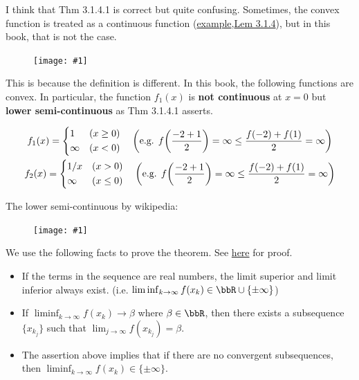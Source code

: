 \documentclass[a4paper, 14pt, dvipdfmx]{extarticle}
\newcommand{\IMG}[2]{
    \begin{figure}[H]
        \centering
        \texttt{[image: \#1]}
    \end{figure}
}
\begin{document}
I think that Thm 3.1.4.1 is correct but quite confusing.
Sometimes, the convex function is treated as a continuous function (\href{https://mathlandscape.com/convex-func}{example},\href{lem:3.1.4}{Lem 3.1.4}), but in this book, that is not the case.

\IMG{convexIsContinuous.png}{0.8}

This is because the definition is different.
In this book, the following functions are convex.
In particular, the function $f_1(x)$ is \textbf{not continuous} at $x=0$ but \textbf{lower semi-continuous} as Thm 3.1.4.1 asserts.

\begin{gather*}
    f_1(x) = \begin{dcases}
        1      & (x \geq 0) \\
        \infty & (x < 0)    \\
    \end{dcases} \quad \qty(\text{e.g. } f\qty(\frac{-2+1}{2}) = \infty \leq \frac{f(-2)+f(1)}{2} = \infty)\\
    f_2(x) = \begin{dcases}
        1/x    & (x > 0)    \\
        \infty & (x \leq 0) \\
    \end{dcases} \quad \qty(\text{e.g. } f\qty(\frac{-2+1}{2}) = \infty \leq \frac{f(-2)+f(1)}{2} = \infty)
\end{gather*}

The lower semi-continuous by wikipedia:
\IMG{lowerSemiContinuous.png}{0.5}

We use the following facts to prove the theorem.
See \href{https://mathlandscape.com/limsup-liminf/}{here} for proof.
\begin{itemize}
    \item If the terms in the sequence are real numbers, the limit superior and limit inferior always exist.
          (i.e. $\liminf_{k\to\infty} f(x_k) \in \bbR \cup \{\pm\infty\}$)
    \item If $\liminf_{k\to\infty} f(x_k) \to \beta$ where $\beta \in \bbR$, then there exists a subsequence $\{ x_{k_j} \}$ such that $\lim_{j\to\infty} f(x_{k_j}) = \beta$.
    \item The assertion above implies that if there are no convergent subsequences, then $\liminf_{k\to\infty} f(x_k) \in \{\pm\infty\}$.
\end{itemize}
\end{document}
